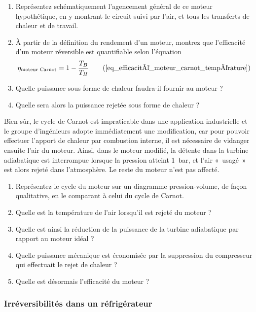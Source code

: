 	\begin{enumerate}
		\item Représentez schématiquement l’agencement général de ce moteur hypothétique, en y montrant le circuit suivi par l’air, et tous les transferts de chaleur et de travail.
		\item À partir de la définition du rendement d’un moteur, montrez que l’efficacité d’un moteur réversible est quantifiable selon l’équation
			\begin{equation}
				\eta_{\text{moteur Carnot}} = 1 - \frac{T_B}{T_H} \tag{\ref{eq_efficacité_moteur_carnot_température}}
			\end{equation}
		\item Quelle puissance sous forme de chaleur faudra-il fournir au moteur ?
		\item Quelle sera alors la puissance rejetée sous forme de chaleur ?
	\end{enumerate}

	Bien sûr, le cycle de Carnot est impraticable dans une application industrielle et le groupe d’ingénieurs adopte immédiatement une modification, car pour pouvoir effectuer l’apport de chaleur par combustion interne, il est nécessaire de vidanger ensuite l’air du moteur. Ainsi, dans le moteur modifié, la détente dans la turbine adiabatique est interrompue lorsque la pression atteint \SI{1}{\bar}, et l’air «~usagé~» est alors rejeté dans l’atmosphère. Le reste du moteur n’est pas affecté.
	
	\begin{enumerate}
		\item Représentez le cycle du moteur sur un diagramme pression-volume, de façon qualitative, en le comparant à celui du cycle de Carnot.
		\item Quelle est la température de l’air lorsqu’il est rejeté du moteur ?
		\item Quelle est ainsi la réduction de la puissance de la turbine adiabatique par rapport au moteur idéal ?
		\item Quelle puissance mécanique est économisée par la suppression du compresseur qui effectuait le rejet de chaleur ?
		\item Quelle est désormais l’efficacité du moteur ?
	\end{enumerate}


\subsubsection{Irréversibilités dans un réfrigérateur}
\label{exo_cours_refrigerateur_carnot}
\wherefrom{[DS n°2 2011, 4pts]}

